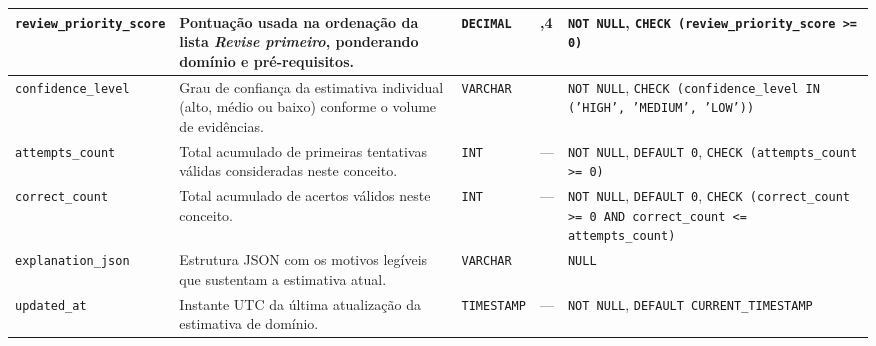 \begin{anexosenv}
{\begin{longtable}{>{\raggedright\arraybackslash}p{3.0cm}>{\raggedright\arraybackslash}p{4.9cm}>{\raggedright\arraybackslash}p{1.75cm}>{\centering\arraybackslash}p{0.95cm}>{\raggedright\arraybackslash}p{3.7cm}}
\hline
\texttt{review\_\allowbreak priority\_\allowbreak score} & Pontuação usada na ordenação da lista \textit{Revise primeiro}, ponderando domínio e pré-requisitos. & \texttt{DECIMAL} & 6,4 & \texttt{NOT NULL}, \texttt{CHECK (review\_\allowbreak priority\_\allowbreak score >= 0)} \\
\hline
\texttt{confidence\_\allowbreak level} & Grau de confiança da estimativa individual (alto, médio ou baixo) conforme o volume de evidências. & \texttt{VARCHAR} & 50 & \texttt{NOT NULL}, \texttt{CHECK (confidence\_\allowbreak level IN ('HIGH', 'MEDIUM', 'LOW'))} \\
\hline
\texttt{attempts\_\allowbreak count} & Total acumulado de primeiras tentativas válidas consideradas neste conceito. & \texttt{INT} & --- & \texttt{NOT NULL}, \texttt{DEFAULT 0}, \texttt{CHECK (attempts\_\allowbreak count >= 0)} \\
\hline
\texttt{correct\_\allowbreak count} & Total acumulado de acertos válidos neste conceito. & \texttt{INT} & --- & \texttt{NOT NULL}, \texttt{DEFAULT 0}, \texttt{CHECK (correct\_\allowbreak count >= 0 AND correct\_\allowbreak count <= attempts\_\allowbreak count)} \\
\hline
\texttt{explanation\_\allowbreak json} & Estrutura JSON com os motivos legíveis que sustentam a estimativa atual. & \texttt{VARCHAR} & 4000 & \texttt{NULL} \\
\hline
\texttt{updated\_\allowbreak at} & Instante UTC da última atualização da estimativa de domínio. & \texttt{TIMESTAMP} & --- & \texttt{NOT NULL}, \texttt{DEFAULT CURRENT\_\allowbreak TIMESTAMP} \\
\hline
\end{longtable}

}
\end{anexosenv}
